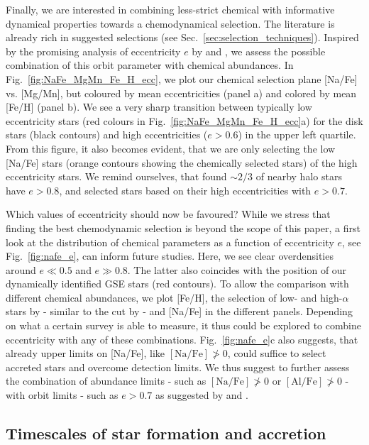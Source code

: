 \documentclass[fleqn,usenatbib]{mnras}
\begin{document}
Finally, we are interested in combining less-strict chemical with informative dynamical properties towards a chemodynamical selection. The literature is already rich in suggested selections (see Sec.~\ref{sec:selection_techniques}). Inspired by the promising analysis of eccentricity $e$ by \citet{Mackereth2019} and \citet{Naidu2020}, we assess the possible combination of this orbit parameter with chemical abundances. In Fig.~\ref{fig:NaFe_MgMn_Fe_H_ecc}, we plot our chemical selection plane [Na/Fe] vs. [Mg/Mn], but coloured by mean eccentricities (panel a) and colored by mean [Fe/H] (panel b). We see a very sharp transition between typically low eccentricity stars (red colours in Fig.~\ref{fig:NaFe_MgMn_Fe_H_ecc}a) for the disk stars (black contours) and high eccentricities ($e > 0.6$) in the upper left quartile. From this figure, it also becomes evident, that we are only selecting the low [Na/Fe] stars (orange contours showing the chemically selected stars) of the high eccentricity stars. We remind ourselves, that \citet{Mackereth2019} found $\sim 2/3$ of nearby halo stars have $e > 0.8$, and \citet{Naidu2020} selected stars based on their high eccentricities with $e > 0.7$.

Which values of eccentricity should now be favoured? While we stress that finding the best chemodynamic selection is beyond the scope of this paper, a first look at the distribution of chemical parameters as a function of eccentricity $e$, see Fig.~\ref{fig:nafe_e}, can inform future studies. Here, we see clear overdensities around $e \ll 0.5$ and $e \gg 0.8$. The latter also coincides with the position of our dynamically identified GSE stars (red contours). To allow the comparison with different chemical abundances, we plot [Fe/H], the selection of low- and high-$\alpha$ stars by \citet{Naidu2020} - similar to the cut by \citet{Nissen2010} - and [Na/Fe] in the different panels. Depending on what a certain survey is able to measure, it thus could be explored to combine eccentricity with any of these combinations. Fig.~\ref{fig:nafe_e}c also suggests, that already upper limits on [Na/Fe], like $\mathrm{[Na/Fe]} \not> 0$, could suffice to select accreted stars and overcome detection limits. We thus suggest to further assess the combination of abundance limits - such as $\mathrm{[Na/Fe]} \not> 0$ or $\mathrm{[Al/Fe]} \not> 0$ - with orbit limits - such as $e > 0.7$ as suggested by \citet{Mackereth2019} and \citet{Naidu2020}.

\subsection{Timescales of star formation and accretion} \label{sec:age_timescale}
\end{document}
